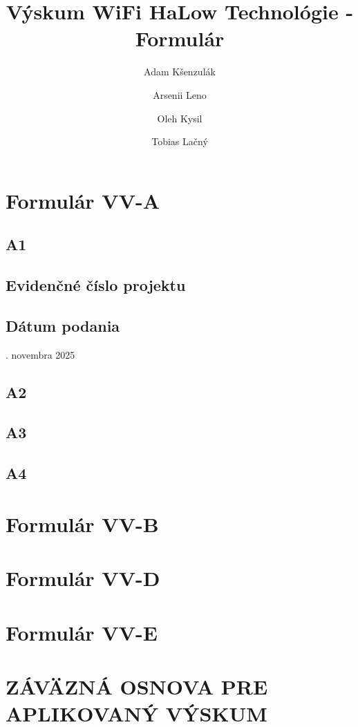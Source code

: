 \documentclass[11pt]{article}
\title{ \bf Výskum WiFi HaLow Technológie - Formulár}
\author{Adam Kšenzulák\and Arsenii Leno\and Oleh Kysil\and Tobias Lačný}
\date{}
\begin{document}
\maketitle


\section{\bf Formulár VV-A}

\subsection*{\bf A1}
\subsection{Evidenčné číslo projektu}
\subsection{Dátum podania}
. novembra 2025
\subsection*{\bf A2}
\subsection*{\bf A3}
\subsection*{\bf A4}

\section{\bf Formulár VV-B}
\section{\bf Formulár VV-D}
\section{\bf Formulár VV-E}
\section{\bf ZÁVÄZNÁ OSNOVA PRE APLIKOVANÝ VÝSKUM}
\end{document}

